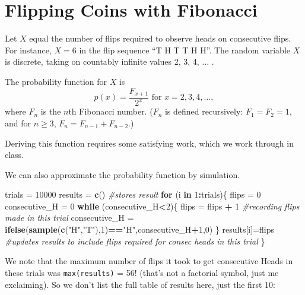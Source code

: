 \documentclass[
]{book}
\newenvironment{Shaded}{\begin{snugshade}}{\end{snugshade}}
\newcommand{\CommentTok}[1]{\textcolor[rgb]{0.56,0.35,0.01}{\textit{#1}}}
\newcommand{\ControlFlowTok}[1]{\textcolor[rgb]{0.13,0.29,0.53}{\textbf{#1}}}
\newcommand{\DecValTok}[1]{\textcolor[rgb]{0.00,0.00,0.81}{#1}}
\newcommand{\FunctionTok}[1]{\textcolor[rgb]{0.13,0.29,0.53}{\textbf{#1}}}
\newcommand{\NormalTok}[1]{#1}
\newcommand{\OtherTok}[1]{\textcolor[rgb]{0.56,0.35,0.01}{#1}}
\newcommand{\SpecialCharTok}[1]{\textcolor[rgb]{0.81,0.36,0.00}{\textbf{#1}}}
\newcommand{\StringTok}[1]{\textcolor[rgb]{0.31,0.60,0.02}{#1}}
\theoremstyle{definition}
\theoremstyle{definition}
\theoremstyle{definition}
\theoremstyle{definition}
\theoremstyle{remark}
\begin{document}
\section{Flipping Coins with Fibonacci}\label{flipping-coins-with-fibonacci}

Let \(X\) equal the number of flips required to observe heads on consecutive flips. For instance, \(X = 6\) in the flip sequence ``T H T T H H''. The random variable \(X\) is discrete, taking on countably infinite values 2, 3, 4, \(\ldots\) .

The probability function for \(X\) is \[p(x) = \frac{F_{x+1}}{2^x} \text{     for } x = 2, 3, 4, \ldots,\] where \(F_n\) is the \(n\)th Fibonacci number. (\(F_n\) is defined recursively: \(F_1 = F_2 = 1\), and for \(n \geq 3\), \(F_n = F_{n-1}+F_{n-2}\).)

Deriving this function requires some satisfying work, which we work through in class.

We can also approximate the probability function by simulation.

\begin{Shaded}
\begin{Highlighting}[]
\NormalTok{trials }\OtherTok{=} \DecValTok{10000}
\NormalTok{results }\OtherTok{=} \FunctionTok{c}\NormalTok{() }\CommentTok{\#stores result}
\ControlFlowTok{for}\NormalTok{ (i }\ControlFlowTok{in} \DecValTok{1}\SpecialCharTok{:}\NormalTok{trials)\{}
\NormalTok{  flips }\OtherTok{=} \DecValTok{0}
\NormalTok{  consecutive\_H }\OtherTok{=} \DecValTok{0}
  \ControlFlowTok{while}\NormalTok{ (consecutive\_H}\SpecialCharTok{\textless{}}\DecValTok{2}\NormalTok{)\{}
\NormalTok{    flips }\OtherTok{=}\NormalTok{ flips }\SpecialCharTok{+} \DecValTok{1} \CommentTok{\#recording flips made in this trial}
\NormalTok{    consecutive\_H }\OtherTok{=} \FunctionTok{ifelse}\NormalTok{(}\FunctionTok{sample}\NormalTok{(}\FunctionTok{c}\NormalTok{(}\StringTok{"H"}\NormalTok{,}\StringTok{"T"}\NormalTok{),}\DecValTok{1}\NormalTok{)}\SpecialCharTok{==}\StringTok{"H"}\NormalTok{,consecutive\_H}\SpecialCharTok{+}\DecValTok{1}\NormalTok{,}\DecValTok{0}\NormalTok{)}
\NormalTok{  \}}
\NormalTok{  results[i]}\OtherTok{=}\NormalTok{flips }\CommentTok{\#updates results to include flips required for consec heads in this trial}
\NormalTok{\}}
\end{Highlighting}
\end{Shaded}

We note that the maximum number of flips it took to get consecutive Heads in these trials was \texttt{max(results)} = 56! (that's not a factorial symbol, just me exclaiming). So we don't list the full table of results here, just the first 10:
\end{document}
